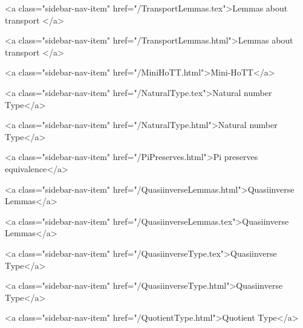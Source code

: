      
        
          <a class="sidebar-nav-item" href="/TransportLemmas.tex">Lemmas about transport </a>
        
      
    
      
        
          <a class="sidebar-nav-item" href="/TransportLemmas.html">Lemmas about transport </a>
        
      
    
      
        
          <a class="sidebar-nav-item" href="/MiniHoTT.html">Mini-HoTT</a>
        
      
    
      
        
          <a class="sidebar-nav-item" href="/NaturalType.tex">Natural number Type</a>
        
      
    
      
        
          <a class="sidebar-nav-item" href="/NaturalType.html">Natural number Type</a>
        
      
    
      
        
          <a class="sidebar-nav-item" href="/PiPreserves.html">Pi preserves equivalence</a>
        
      
    
      
        
          <a class="sidebar-nav-item" href="/QuasiinverseLemmas.html">Quasiinverse Lemmas</a>
        
      
    
      
        
          <a class="sidebar-nav-item" href="/QuasiinverseLemmas.tex">Quasiinverse Lemmas</a>
        
      
    
      
        
          <a class="sidebar-nav-item" href="/QuasiinverseType.tex">Quasiinverse Type</a>
        
      
    
      
        
          <a class="sidebar-nav-item" href="/QuasiinverseType.html">Quasiinverse Type</a>
        
      
    
      
        
          <a class="sidebar-nav-item" href="/QuotientType.html">Quotient Type</a>
        
